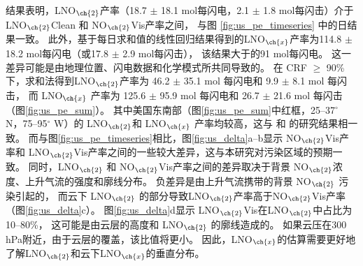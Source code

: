 结果表明，LNO$_{\ch{2}}$产率（18.7 $\pm$ 18.1 mol每闪电，2.1 $\pm$ 1.8 mol每闪击）介于 LNO$_{\ch{2}}$Clean 和 NO$_{\ch{2}}$Vis产率之间，
与图 \ref{fig:us_pe_timeseries} 中的日结果一致。
此外，基于每日求和值的线性回归结果得到的LNO$_{\ch{x}}$产率为114.8 $\pm$ 18.2 mol每闪电（或17.8 $\pm$ 2.9 mol每闪击），
该结果大于\citet{Pickering.2016}的91 mol每闪电。
这一差异可能是由地理位置、闪电数据和化学模式所共同导致的。
在 CRF $\geq$ 90\% 下，求和法得到LNO$_{\ch{2}}$产率为 46.2 $\pm$ 35.1 mol 每闪电和 9.9 $\pm$ 8.1 mol 每闪击，
而 LNO$_{\ch{x}}$ 产率为 125.6 $\pm$ 95.9 mol 每闪电和 26.7 $\pm$ 21.6 mol 每闪击（图\ref{fig:us_pe_sum}）。
其中美国东南部（图\ref{fig:us_pe_sum}中红框，25--37$^{\circ}$ N，75--95$^{\circ}$ W）的 LNO$_{\ch{2}}$和 LNO$_{\ch{x}}$ 产率均较高，这与\citet{Lapierre.2020} 和 \citet{Bucsela.2019}的研究结果相一致。
而与图\ref{fig:us_pe_timeseries}相比，图\ref{fig:us_delta}a--b显示
NO$_{\ch{2}}$Vis产率和 LNO$_{\ch{2}}$Vis产率之间的一些较大差异，这与本研究对污染区域的预期一致。
同时，LNO$_{\ch{2}}$ 和 NO$_{\ch{2}}$Vis产率之间的差异取决于背景 NO$_{\ch{2}}$浓度、上升气流的强度和廓线分布。
负差异是由上升气流携带的背景 NO$_{\ch{2}}$ 污染引起的，
而云下 LNO$_{\ch{2}}$ 的部分导致LNO$_{\ch{2}}$产率高于NO$_{\ch{2}}$Vis产率（图\ref{fig:us_delta}c）。
图\ref{fig:us_delta}d显示 LNO$_{\ch{2}}$Vis在LNO$_{\ch{2}}$中占比为 10--80\%，
这可能是由云层的高度和 LNO$_{\ch{2}}$ 的廓线造成的。
如果云压在300 hPa附近，由于云层的覆盖，该比值将更小。
因此，LNO$_{\ch{x}}$的估算需要更好地了解LNO$_{\ch{2}}$和云下LNO$_{\ch{x}}$的垂直分布。


